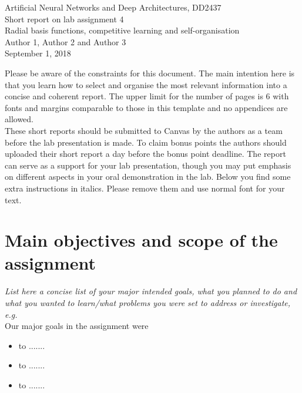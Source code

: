 \documentclass[a4paper]{article}
\begin{document}
\begin{center}
  {\large Artificial Neural Networks and Deep Architectures, DD2437}\\
  \vspace{7mm}
  {\huge Short report on lab assignment 4\\[1ex]}
  {\Large Radial basis functions, competitive learning and self-organisation}\\
  \vspace{8mm}  
  {\Large Author 1, Author 2 and Author 3\\}
  \vspace{4mm}
  {\large September 1, 2018\\}
\end{center}

\begin{framed}
Please be aware of the constraints for this document. The main intention here is that you learn how to select and organise the most relevant information into a concise and coherent report. The upper limit for the number of pages is 6 with fonts and margins comparable to those in this template and no appendices are allowed. \\
These short reports should be submitted to Canvas by the authors as a team before the lab presentation is made. To claim bonus points the authors should uploaded their short report a day before the bonus point deadline. The report can serve as a support for your lab presentation, though you may put emphasis on different aspects in your oral demonstration in the lab.
Below you find some extra instructions in italics. Please remove them and use normal font for your text.
\end{framed}

\section{Main objectives and scope of the assignment}

\textit{List here a concise list of your major intended goals, what you planned to do and what you wanted to learn/what problems you were set to address or investigate, e.g.}\\
Our major goals in the assignment were  
\begin{itemize}
\item to .......
\item to .......
\item to ....... 
\end{itemize}
\end{document}
